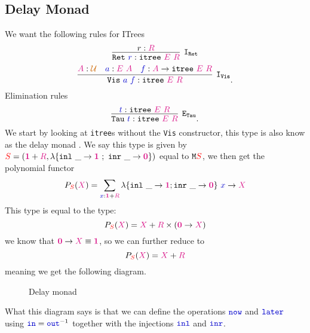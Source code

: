 \documentclass[twoside,11pt,openright]{report}
\newcommand*{\term}[1]{\textcolor{blue!80!black}{#1}}
\newcommand*{\type}[1]{\textcolor{magenta!90!black}{#1}}
\newcommand*{\container}[1]{\textcolor{red}{#1}}
\newcommand*{\universe}[1]{\textcolor{orange!80!black}{#1}}
\newcommand*{\unit}{\type{\textbf{1}}}
\newcommand*{\empt}{\type{\textbf{0}}}
\begin{document}
\subsection{Delay Monad}
We want the following rules for ITrees
\begin{equation}
  \infer [\mathtt{I}_\mathtt{Ret}]{\mathtt{Ret}~\term{r} : \mathtt{itree}~\type{E}~\type{R}}{r : \type{R}}
\end{equation}
\begin{equation}
  \infer[\mathtt{I}_\mathtt{Vis}]{\mathtt{Vis}~\term{a}~\term{f} : \mathtt{itree}~\type{E}~\type{R}}{\type{A} : \universe{\mathcal{U}} & \term{a} : \type{E}~\type{A} & \term{f} : \type{A} \rightarrow \texttt{itree}~\type{E}~\type{R}}.
\end{equation}
Elimination rules
\begin{equation}
  \infer[\mathtt{E}_\mathtt{Tau}]{\mathtt{Tau}~\term{t} : \mathtt{itree}~\type{E}~\type{R}}{\term{t} : \mathtt{itree}~\type{E}~\type{R}}.
\end{equation}
We start by looking at \texttt{itree}s without the \texttt{Vis} constructor, this type is also know as the delay monad . We say this type is given by \(\container{S} = (\unit + \type{R},\lambda \{ \texttt{inl}~\_ \rightarrow \unit~;~\texttt{inr}~\_ \rightarrow \empt \})\) equal to \(\mathtt{M}\container{S}\), we then get the polynomial functor
\begin{equation}
  P_{\container{S}}(\type{X}) = \sum_{\term{x} : \unit + \type{R}} \lambda \{ \texttt{inl}~\_ \rightarrow \unit ; \texttt{inr}~\_ \rightarrow \empt\}~\term{x} \rightarrow \type{X}
\end{equation}
This type is equal to the type:
\begin{equation}
  P_{\container{S}}(\type{X}) = \type{X} + \type{R} \times (\empt \rightarrow \type{X})
\end{equation}
we know that \(\empt \rightarrow \type{X} \equiv \unit\), so we can further reduce to
\begin{equation}
  P_{\container{S}}(\type{X}) = \type{X} + \type{R}
\end{equation}
meaning we get the following diagram.
\begin{figure}[h]
  \centering
  \caption{Delay monad}
\end{figure}
What this diagram says is that we can define the operations \(\term{\mathtt{now}}\) and \(\term{\mathtt{later}}\) using \(\term{\mathtt{in}} = \term{\mathtt{out}}^{-1}\) together with the injections \(\term{\mathtt{inl}}\) and \(\term{\mathtt{inr}}\). 
\end{document}

